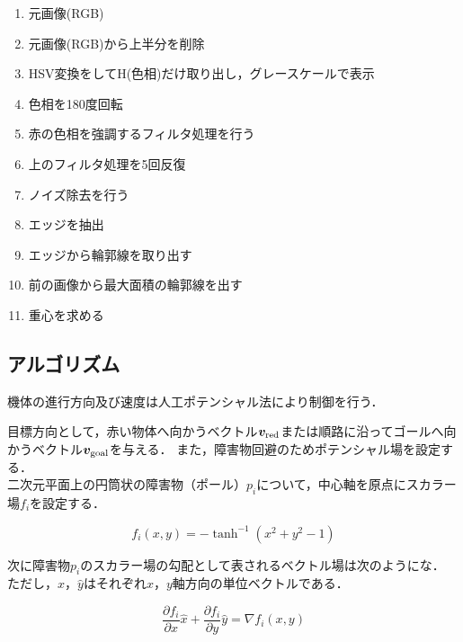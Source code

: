 \documentclass[11pt,a4]{jsarticle}
\begin{document}
\begin{enumerate}
 \item 元画像(RGB)
 \item 元画像(RGB)から上半分を削除
 \item HSV変換をしてH(色相)だけ取り出し，グレースケールで表示
 \item 色相を180度回転
 \item 赤の色相を強調するフィルタ処理を行う
 \item 上のフィルタ処理を5回反復
 \item ノイズ除去を行う
 \item エッジを抽出
 \item エッジから輪郭線を取り出す
 \item 前の画像から最大面積の輪郭線を出す
 \item 重心を求める
\end{enumerate}


\newpage
\subsection{アルゴリズム} 

  機体の進行方向及び速度は人工ポテンシャル法により制御を行う．

  目標方向として，赤い物体へ向かうベクトル$\bm{v}_{\rm{red}}$または順路に沿ってゴールへ向かうベクトル$\bm{v}_{\rm{goal}}$を与える．
  また，障害物回避のためポテンシャル場を設定する．\\

  二次元平面上の円筒状の障害物（ポール）$p_i$について，中心軸を原点にスカラー場$f_i$を設定する．

  \begin{equation}
    f_i(x,y) = - \tanh^{-1}(x^2 + y^2 - 1)
  \end{equation}

  次に障害物$p_i$のスカラー場の勾配として表されるベクトル場は次のようにな．
  ただし，$\hat{x}$，$\hat{y}$はそれぞれ$x$，$y$軸方向の単位ベクトルである．

  \begin{equation}
    \frac{\partial f_i}{\partial x}\hat{x} + \frac{\partial f_i}{\partial y}\hat{y} = \nabla f_i(x,y)
  \end{equation}
\end{document}
